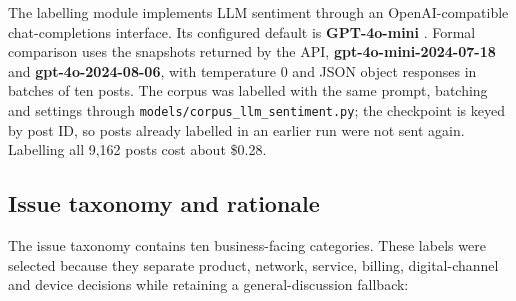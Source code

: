 \documentclass[11pt,a4paper]{article}
\begin{document}
The labelling module implements LLM sentiment through an OpenAI-compatible chat-completions interface. Its configured default is \textbf{GPT-4o-mini} \cite{openai2024gpt4o}. Formal comparison uses the snapshots returned by the API, \textbf{gpt-4o-mini-2024-07-18} and \textbf{gpt-4o-2024-08-06}, with temperature 0 and JSON object responses in batches of ten posts. The corpus was labelled with the same prompt, batching and settings through \texttt{models/corpus\_llm\_sentiment.py}; the checkpoint is keyed by post ID, so posts already labelled in an earlier run were not sent again. Labelling all 9,162 posts cost about \$0.28.

\subsection{Issue taxonomy and rationale}

The issue taxonomy contains ten business-facing categories. These labels were selected because they separate product, network, service, billing, digital-channel and device decisions while retaining a general-discussion fallback:
\end{document}
